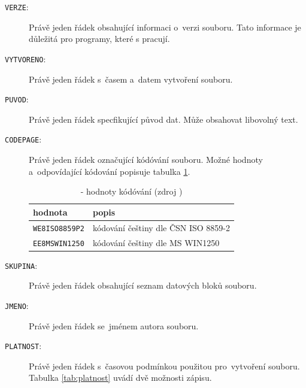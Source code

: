 \begin{description}
	\item[\texttt{VERZE}:] Právě jeden řádek obsahující informaci o~verzi  souboru. Tato informace je důležitá pro programy, které s  pracují.
	\item[\texttt{VYTVORENO}:] Právě jeden řádek s~časem a~datem vytvoření souboru.
	\item[\texttt{PUVOD}:] Právě jeden řádek specfikující původ dat. Může obsahovat libovolný text.
	\item[\texttt{CODEPAGE}:] Právě jeden řádek označující kódóvání souboru. Možné hodnoty a~odpovídající kódování popisuje tabulka 	\ref{tab:kodovani}.

    \begin{table}[H]
        \begin{tabular}{|l|l|}
            \hline
             hodnota & popis \\
            \hline
            \hline
             \texttt{WE8ISO8859P2} & kódování češtiny dle ČSN ISO 8859-2 \\ \hline
             \texttt{EE8MSWIN1250} & kódování češtiny dle MS WIN1250 \\
             \hline
        \end{tabular}
        \centering
        \caption[ - hodnoty kódóvání]{ - hodnoty kódóvání (zdroj \citep{struktura_vfk})}
        \label{tab:kodovani}
    \end{table}

	\item[\texttt{SKUPINA}:] Právě jeden řádek obsahující seznam datových bloků souboru.
	\item[\texttt{JMENO}:] Právě jeden řádek se~jménem autora souboru.
	\item[\texttt{PLATNOST}:] Právě jeden řádek s~časovou podmínkou použitou pro~vytvoření souboru. Tabulka \ref{tab:platnost} uvádí dvě možnosti zápisu.


\end{description}
